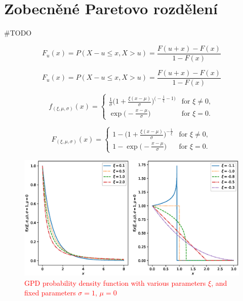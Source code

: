 \chapter{Zobecněné Paretovo rozdělení}\label{chap:gpd}
\#TODO

\begin{equation}
    F_u(x)=P(X-u \leq x,X>u)=\frac{F(u+x)-F(x)}{1-F(x)}
\end{equation}

\begin{equation}
    F_u(x)=P(X-u \leq x,X>u)=\frac{F(u+x)-F(x)}{1-F(x)}
\end{equation}


\begin{equation}
  f_{(\xi,\mu,\sigma)}(x)=\begin{cases}
    \frac{1}{\sigma}\Bigg(1+\frac{\xi(x-\mu)}{\sigma}\Bigg)^{\Big(-\frac{1}{\xi}-1\Big)} & \text{for $\xi \neq 0$},\\
    \exp \Big(-\frac{x-\mu}{\sigma}\Big) & \text{for $\xi = 0$}.
  \end{cases}
\end{equation}


\begin{equation}
  F_{(\xi,\mu,\sigma)}(x)=\begin{cases}
    1 - \Bigg(1+\frac{\xi(x-\mu)}{\sigma}\Bigg)^{-\frac{1}{\xi}} & \text{for $\xi \neq 0$},\\
    1 - \exp{\Big(-\frac{x-\mu}{\sigma} \Big)} & \text{for $\xi = 0$}.
  \end{cases}
\end{equation}

\begin{figure}
    \centering
    \includegraphics[scale=0.68]{IMG/MDPI/pdfs.eps}
    \caption{\textcolor{red}{GPD probability density function with various parameters $\xi$, and fixed parameters $\sigma=1$, $\mu=0$}}
    \label{fig:gpd_pdfs}
\end{figure}






